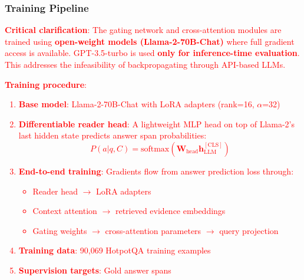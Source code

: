 \documentclass[10pt,twocolumn]{article}
\newcommand{\revisioncritical}[1]{\textcolor{red}{#1}}
\begin{document}
\subsubsection{Training Pipeline}
\label{sec:training_pipeline}
\revisioncritical{

\textbf{Critical clarification}: The gating network and cross-attention modules are trained using \textbf{open-weight models (Llama-2-70B-Chat)} where full gradient access is available. GPT-3.5-turbo is used \textbf{only for inference-time evaluation}. This addresses the infeasibility of backpropagating through API-based LLMs.

\textbf{Training procedure}:

\begin{enumerate}
    \item \textbf{Base model}: Llama-2-70B-Chat with LoRA adapters \cite{hu2022lora} (rank=16, $\alpha$=32)
    
    \item \textbf{Differentiable reader head}: A lightweight MLP head on top of Llama-2's last hidden state predicts answer span probabilities:
    \begin{equation}
    P(a|q, C) = \text{softmax}(\mathbf{W}_{\text{head}} \mathbf{h}_{\text{LLM}}^{[\text{CLS}]})
    \end{equation}
    
    \item \textbf{End-to-end training}: Gradients flow from answer prediction loss through:
    \begin{itemize}
        \item Reader head $\rightarrow$ LoRA adapters
        \item Context attention $\rightarrow$ retrieved evidence embeddings
        \item Gating weights $\rightarrow$ cross-attention parameters $\rightarrow$ query projection
    \end{itemize}
    
    \item \textbf{Training data}: 90,069 HotpotQA training examples
    
    \item \textbf{Supervision targets}: Gold answer spans
    

\end{enumerate}}
\end{document}
